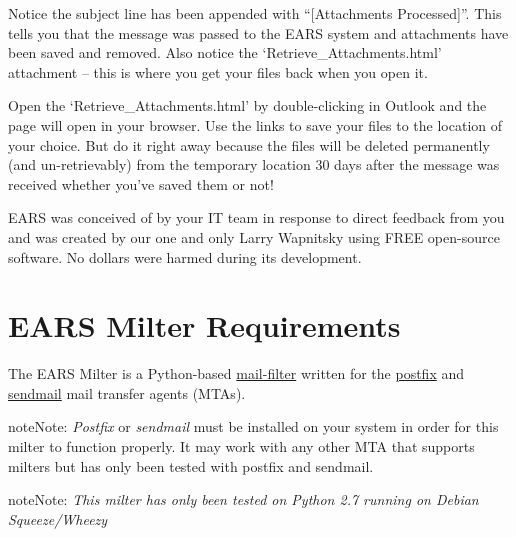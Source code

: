 \documentclass[letterpaper,10pt,english]{sphinxmanual}
\begin{document}
Notice the subject line has been appended with “{[}Attachments Processed{]}”. This tells you that the message was passed to the EARS system and attachments have been saved and removed. Also notice the ‘Retrieve\_Attachments.html’ attachment – this is where you get your files back when you open it.

Open the ‘Retrieve\_Attachments.html’ by double-clicking in Outlook and the page will open in your browser. Use the links to save your files to the location of your choice. But do it right away because the files will be deleted permanently (and un-retrievably) from the temporary location 30 days after the message was received whether you’ve saved them or not!

EARS was conceived of by your IT team in response to direct feedback from you and was created by our one and only Larry Wapnitsky using FREE open-source software. No dollars were harmed during its development.


\chapter{EARS Milter Requirements}
\label{requirements:ears-milter-requirements}\label{requirements::doc}
The EARS Milter is a Python-based \href{http://www.milter.org}{mail-filter} written for the \href{http://www.postfix.org}{postfix} and \href{http://www.sendmail.com/sm/open\_source/docs/}{sendmail} mail transfer agents (MTAs).

\begin{notice}{note}{Note:}
\emph{Postfix} or \emph{sendmail} must be installed on your system in order for this milter to function properly.
It may work with any other MTA that supports milters but has only been tested with postfix and sendmail.
\end{notice}

\begin{notice}{note}{Note:}
\emph{This milter has only been tested on Python 2.7 running on Debian Squeeze/Wheezy}
\end{notice}
\end{document}
